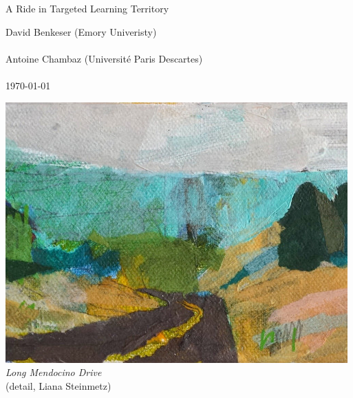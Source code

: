 \begin{titlepage}
  \centering
  \vspace*{3cm}
  \begin{Huge}
    {\color{WildStrawberry}{\hrule}}
    \vspace{1cm}
    A Ride in Targeted Learning Territory
    \vspace{1cm}
    {\color{WildStrawberry}{\hrule}}
  \end{Huge}
  \vspace*{1cm}  
  \begin{large}
    David Benkeser (Emory Univeristy)\\~\\
    Antoine Chambaz (Universit\'e Paris Descartes)\\~\\
    \today\par
  \end{large}
  \vspace*{1cm}
  \includegraphics{cover.jpg}\\
  \textit{Long Mendocino Drive}\\
  (detail, Liana Steinmetz)
\end{titlepage}



